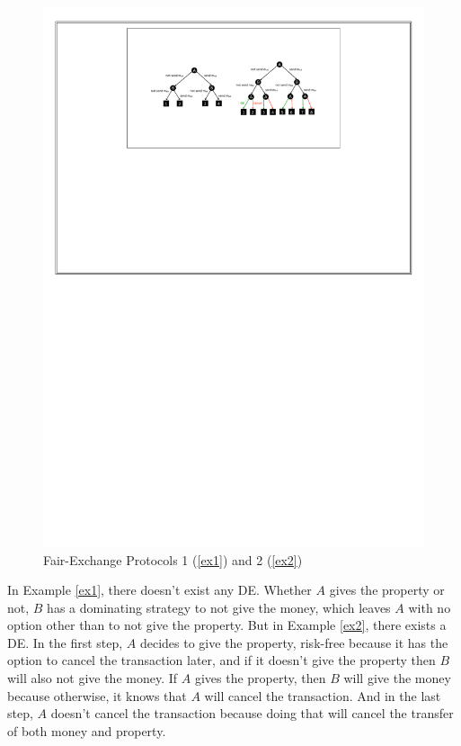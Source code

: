 \documentclass[format=acmsmall, review=false]{acmart}
\begin{document}
\begin{figure}
\caption{ Fair-Exchange Protocols 1 (\ref{ex1}) and 2 (\ref{ex2}) }
\includegraphics{fep}
\end{figure}

In Example \ref{ex1}, there doesn't exist any DE. Whether $A$ gives the property or not, $B$ has a dominating strategy to not give the money, which leaves $A$ with no option other than to not give the property. But in Example \ref{ex2}, there exists a DE. In the first step, $A$ decides to give the property, risk-free because it has the option to cancel the transaction later, and if it doesn't give the property then $B$ will also not give the money. If $A$ gives the property, then $B$ will give the money because otherwise, it knows that $A$ will cancel the transaction. And in the last step, $A$ doesn't cancel the transaction because doing that will cancel the transfer of both money and property.
\end{document}
